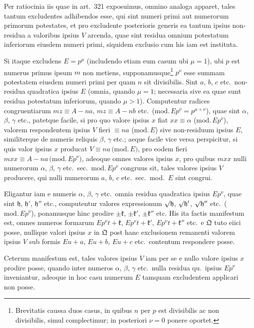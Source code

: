 \documentclass[12pt,a4paper]{article}
\theoremstyle{plain}
\theoremstyle{definition}
\theoremstyle{remark}
\newcommand{\Q}{\mathfrak{Q}}
\begin{document}
Per ratiocinia iis quae in art.\ 321 exposuimus, omnino analoga apparet, tales tantum excludentes adhibendos esse, qui sint numeri primi aut numerorum primorum potestates, et pro excludente posterioris generis ea tantum ipsius non-residua a valoribus ipsius $V$ arcenda, quae sint residua omnium potestatum inferiorum eiusdem numeri primi, siquidem exclusio cum his iam est instituta.

Si itaque excludens $E=p^\mu$ (includendo etiam eum casum ubi $\mu=1$), ubi $p$ est numerus primus ipsum $m$ non metiens, supponamusque\footnote{Brevitatis caussa duos casus, in quibus $n$ per $p$ est divisibilis ac non divisibilis, simul complectimur; in posteriori $\nu=0$ ponere oportet.} $p^\nu$ esse summam potestatem eiusdem numeri primi per quam $n$ sit divisibilis. Sint $a$, $b$, $c$ etc.\ non-residua quadratica ipsius $E$ (omnia, quando $\mu=1$; necessaria sive ea quae sunt residua potestatum inferiorum, quando $\mu>1$). Computentur radices congruentiarum $mz\equiv A-na$, $mz\equiv A-nb$ etc.\ ($\mathrm{mod.}\,Ep^\nu=p^{\mu+\nu}$), quae sint $\alpha$, $\beta$, $\gamma$ etc., patetque facile, si pro quo valore ipsius $x$ fiat $xx\equiv\alpha$ ($\mathrm{mod.}\,Ep^\nu$), valorem respondentem ipsius $V$ fieri $\equiv na$ ($\mathrm{mod.}\,E$) sive non-residuum ipsius $E$, similiterque de numeris reliquis $\beta$, $\gamma$ etc.; aeque facile vice versa perspicitur, si quis valor ipsius $x$ producat $V\equiv na\,\mathrm{(mod.}\,E)$, pro eodem fieri $mxx\equiv A-na\,\mathrm{(mod.}\,Ep^\nu)$, adeoque omnes valores ipsius $x$, pro quibus $mxx$ nulli numerorum $\alpha$, $\beta$, $\gamma$ etc.\ sec.\ $\mathrm{mod.}\,Ep^\nu$ congruus sit, tales valores ipsius $V$ producere, qui nulli numerorum $a$, $b$, $c$ etc.\ sec.\ mod.\ $E$ sint congrui.

Eligantur iam e numeris $\alpha$, $\beta$, $\gamma$ etc.\ omnia residua quadratica ipsius $Ep^\nu$, quae sint $\mathfrak{h}$, $\mathfrak{h}'$, $\mathfrak{h}''$ etc., computentur valores expressionum $\surd\mathfrak{h}$, $\surd\mathfrak{h}'$, $\surd\mathfrak{h}''$ etc.\ ($\mathrm{mod.}\,Ep^\nu$), ponamusque hinc prodire $\pm\mathfrak{k}$, $\pm\mathfrak{k}'$, $\pm\mathfrak{k}''$ etc. His ita factis manifestum est, omnes numeros formarum $Ep^\nu t+\mathfrak{k}$, $Ep^\nu t+\mathfrak{k}'$, $Ep^\nu t+\mathfrak{k}''$ etc.\ e $\Q$ tuto eiici posse, nullique valori ipsius $x$ in $\Q$ post hanc exclusionem remanenti valorem ipsius $V$ sub formis $Eu+a$, $Eu+b$, $Eu+c$ etc.\ contentum respondere posse.

Ceterum manifestum est, tales valores ipsius $V$ iam per se e nullo valore ipsius $x$ prodire posse, quando inter numeros $\alpha$, $\beta$, $\gamma$ etc.\ nulla residua qu.\ ipsius $Ep^\nu$ inveniantur, adeoque in hoc casu numerum $E$ tamquam excludentem applicari non posse.
\end{document}
